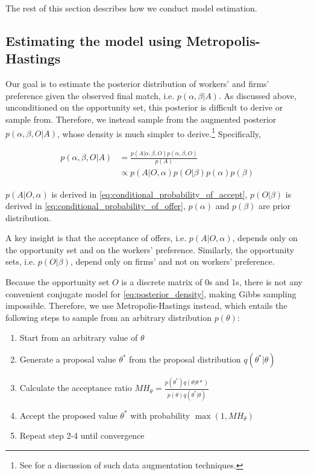The rest of this section describes how we conduct model estimation.

\subsection{Estimating the model using Metropolis-Hastings}

Our goal is to estimate the posterior distribution of workers' and firms'
preference given the observed final match, i.e. $p(\alpha, \beta | A)$.
As discussed above, unconditioned on the opportunity set, this posterior is difficult to
derive or sample from. Therefore, we
instead sample from the augmented posterior $p(\alpha, \beta, O | A)$, whose
density is much simpler to derive.\footnote{See \citep{Tanner1987} for a
  discussion of such data augmentation techniques.} Specifically,

\begin{align}
  p(\alpha, \beta, O | A) &= \frac{p(A | \alpha, \beta, O) p(\alpha, \beta, O)}{p(A)} \\
  &\propto p(A|O, \alpha) p(O|\beta) p(\alpha) p(\beta) 
    \label{eq:posterior_density}
\end{align}

$p(A|O, \alpha)$ is derived in
\eqref{eq:conditional_probability_of_accept}, $p(O|\beta)$ is derived in
\eqref{eq:conditional_probability_of_offer}, $p(\alpha)$ and $p(\beta)$ are
prior distribution.

A key insight is that the acceptance of offers, i.e. $p(A|O, \alpha)$, depends only on the opportunity
set and on the workers' preference. Similarly, the opportunity sets, i.e.
$p(O|\beta)$, depend only on firms' and not on workers' preference. 

Because the opportunity set $O$ is a discrete matrix of 0s and 1s, there is not
any convenient conjugate model for \eqref{eq:posterior_density}, making Gibbs
sampling impossible. Therefore, we use Metropolis-Hastings instead, which
entails the following steps to sample from an arbitrary distribution $p(\theta)$:

\begin{enumerate}
\item Start from an arbitrary value of $\theta$
\item Generate a proposal value $\theta^*$ from the proposal distribution $q(\theta^*|\theta)$
\item Calculate the acceptance ratio $MH_{\theta} = \frac{p(\theta^*)q(\theta|\theta*)}{p(\theta)q(\theta^*|\theta)}$
\item Accept the proposed value $\theta^*$ with probability $\max(1, MH_{\theta})$
\item Repeat step 2-4 until convergence
\end{enumerate}


